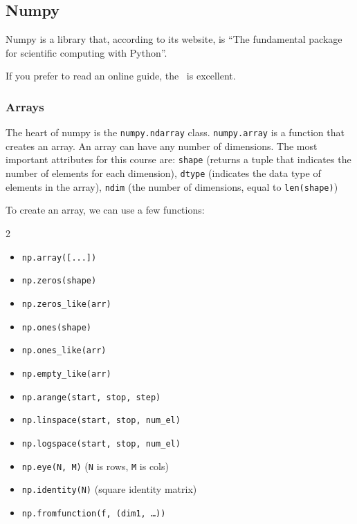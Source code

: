 \newpage
\subsection{Numpy}
Numpy is a library that, according to its website, is ``The fundamental package for scientific computing with Python''.

If you prefer to read an online guide, the \ is excellent.

\subsubsection{Arrays}
The heart of numpy is the \texttt{numpy.ndarray} class. \texttt{numpy.array} is a function that creates an array. An array can have any number of dimensions.
The most important attributes for this course are: \texttt{shape} (returns a tuple that indicates the number of elements for each dimension),
\texttt{dtype} (indicates the data type of elements in the array),
\texttt{ndim} (the number of dimensions, equal to \texttt{len(shape)})

To create an array, we can use a few functions:
\drmvspace
\begin{multicols}{2}
    \begin{itemize}[noitemsep]
        \item \texttt{np.array([...])}
        \item \texttt{np.zeros(shape)}
        \item \texttt{np.zeros\_like(arr)}
        \item \texttt{np.ones(shape)}
        \item \texttt{np.ones\_like(arr)}
        \item \texttt{np.empty\_like(arr)}
        \item \texttt{np.arange(start, stop, step)}
        \item \texttt{np.linspace(start, stop, num\_el)}
        \item \texttt{np.logspace(start, stop, num\_el)}
        \item \texttt{np.eye(N, M)} (\texttt{N} is rows, \texttt{M} is cols)
        \item \texttt{np.identity(N)} (square identity matrix)
        \item \texttt{np.fromfunction(f, (dim1, \dots))}
    \end{itemize}
\end{multicols}

